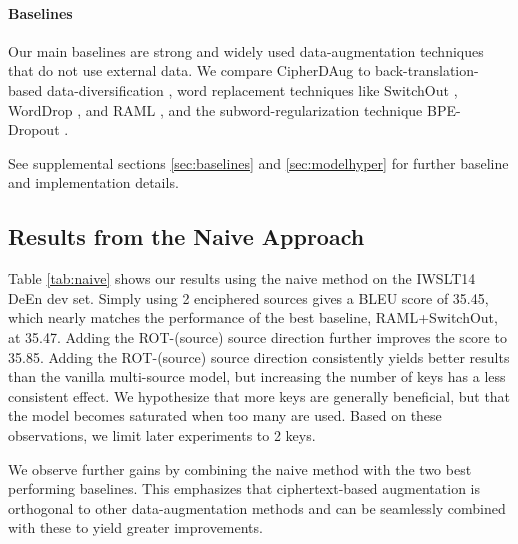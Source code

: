 \documentclass[11pt]{article}
\begin{document}
\vspace{-0.5em}
\paragraph{Baselines} Our main baselines are strong and widely used data-augmentation techniques that do not use external data. We compare CipherDAug to back-translation-based data-diversification \cite{nguyen19datadiverse}, word replacement techniques like SwitchOut \cite{wang-etal-2018-switchout}, WordDrop \cite{sennrich-etal-2016-edinburgh}, and RAML \cite{Norouzi2016RewardAM}, and the subword-regularization technique BPE-Dropout \cite{provilkov2020bpe}.

See supplemental sections \ref{sec:baselines} and \ref{sec:modelhyper} for further baseline and implementation details.
\subsection{Results from the Naive Approach}\label{sec:naive-results}
Table \ref{tab:naive} shows our results using the naive method on the IWSLT14 DeEn dev set. Simply using 2 enciphered sources gives a BLEU score of 35.45, which nearly matches the performance of the best baseline, RAML+SwitchOut, at 35.47. Adding the ROT-(source)  source direction further improves the score to 35.85. 
Adding the ROT-(source)  source direction consistently yields better results than the vanilla multi-source model, but increasing the number of keys has a less consistent effect. We hypothesize that more keys are generally beneficial, but that the model becomes saturated when too many are used. Based on these observations, we limit later experiments to 2 keys.

We observe further gains by combining the naive method with the two best performing baselines. This emphasizes that ciphertext-based augmentation is orthogonal to other data-augmentation methods and can be seamlessly combined with these to yield greater improvements.
\end{document}
